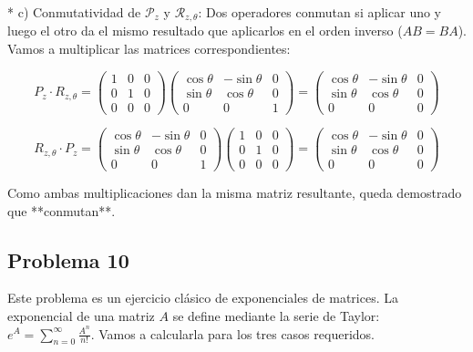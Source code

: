 \documentclass[11pt,spanish]{article}
\newcounter{problema}
\begin{document}
* 
c) Conmutatividad de $\mathcal{P}_{z}$ y $\mathcal{R}_{z,\theta}$:
Dos operadores conmutan si aplicar uno y luego el otro da el mismo resultado que aplicarlos en el orden inverso ($AB = BA$). Vamos a multiplicar las matrices correspondientes:



$$P_{z} \cdot R_{z,\theta} = \begin{pmatrix} 1 & 0 & 0 \\ 0 & 1 & 0 \\ 0 & 0 & 0 \end{pmatrix} \begin{pmatrix} \cos\theta & -\sin\theta & 0 \\ \sin\theta & \cos\theta & 0 \\ 0 & 0 & 1 \end{pmatrix} = \begin{pmatrix} \cos\theta & -\sin\theta & 0 \\ \sin\theta & \cos\theta & 0 \\ 0 & 0 & 0 \end{pmatrix}$$


$$R_{z,\theta} \cdot P_{z} = \begin{pmatrix} \cos\theta & -\sin\theta & 0 \\ \sin\theta & \cos\theta & 0 \\ 0 & 0 & 1 \end{pmatrix} \begin{pmatrix} 1 & 0 & 0 \\ 0 & 1 & 0 \\ 0 & 0 & 0 \end{pmatrix} = \begin{pmatrix} \cos\theta & -\sin\theta & 0 \\ \sin\theta & \cos\theta & 0 \\ 0 & 0 & 0 \end{pmatrix}$$


Como ambas multiplicaciones dan la misma matriz resultante, queda demostrado que **conmutan**.

\subsection*{Problema 10}

Este problema es un ejercicio clásico de exponenciales de matrices. La exponencial de una matriz $A$ se define mediante la serie de Taylor: $e^{A} = \sum_{n=0}^{\infty} \frac{A^{n}}{n!}$. Vamos a calcularla para los tres casos requeridos.
\end{document}
